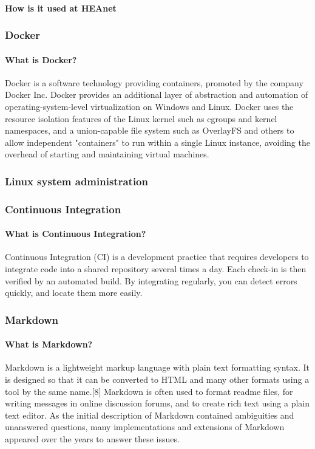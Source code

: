 \documentclass{article}
\begin{document}
\paragraph{How is it used at HEAnet}
\subsubsection{Docker}
\paragraph{What is Docker?}
Docker is a software technology providing containers, promoted by the company Docker Inc. Docker provides an additional layer of abstraction and automation of operating-system-level virtualization on Windows and Linux. Docker uses the resource isolation features of the Linux kernel such as cgroups and kernel namespaces, and a union-capable file system such as OverlayFS and others to allow independent "containers" to run within a single Linux instance, avoiding the overhead of starting and maintaining virtual machines.
\subsubsection{Linux system administration}
\subsubsection{Continuous Integration}
\paragraph{What is Continuous Integration?}
Continuous Integration (CI) is a development practice that requires developers to integrate code into a shared repository several times a day. Each check-in is then verified by an automated build. By integrating regularly, you can detect errors quickly, and locate them more easily.
\subsubsection{Markdown}
\paragraph{What is Markdown?}
Markdown is a lightweight markup language with plain text formatting syntax. It is designed so that it can be converted to HTML and many other formats using a tool by the same name.[8] Markdown is often used to format readme files, for writing messages in online discussion forums, and to create rich text using a plain text editor. As the initial description of Markdown contained ambiguities and unanswered questions, many implementations and extensions of Markdown appeared over the years to answer these issues.
\end{document}
